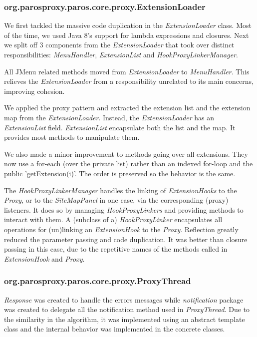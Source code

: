 \subsubsection{org.parosproxy.paros.core.proxy.ExtensionLoader}
We first tackled the massive code duplication in  the \textit{ExtensionLoader} class. Most of the time, we used Java 8's support for lambda expressions and closures. Next we split off 3 components from the \textit{ExtensionLoader} that took over distinct responsibilities: \textit{MenuHandler}, \textit{ExtensionList} and \textit{HookProxyLinkerManager}.
\par
All JMenu related methods moved from \textit{ExtensionLoader} to \textit{MenuHandler}. This relieves the \textit{ExtensionLoader} from a responsibility unrelated to its main concerns, improving cohesion.
\par
We applied the proxy pattern and extracted the extension list and the extension map from the \textit{ExtensionLoader}. Instead, the \textit{ExtensionLoader} has an \textit{ExtensionList} field. \textit{ExtensionList} encapsulate both the list and the map. It provides most methods to manipulate them.
\par
We also made a minor improvement to methods going over all extensions. They now use a for-each (over the private list) rather than an indexed for-loop and the public 'getExtension(i)'. The order is preserved so the behavior is the same.
\par
The \textit{HookProxyLinkerManager} handles the linking of \textit{ExtensionHooks} to the \textit{Proxy}, or to the \textit{SiteMapPanel} in one case, via the corresponding (proxy) listeners. It does so by managing \textit{HookProxyLinkers} and providing methods to interact with them.
A (subclass of a) \textit{HookProxyLinker} encapsulates all operations for (un)linking an \textit{ExtensionHook} to the \textit{Proxy}. Reflection greatly reduced the parameter passing and code duplication. It was better than closure passing in this case, due to the repetitive names of the methods called in \textit{ExtensionHook} and \textit{Proxy}.
\subsubsection{org.parosproxy.paros.core.proxy.ProxyThread}

\textit{Response} was created to handle the errors messages while \textit{notification} package was created to delegate all the notification method used in \textit{ProxyThread}. Due to the similarity in the algorithm, it was implemented using an abstract template class and the internal behavior was implemented in the concrete classes.
